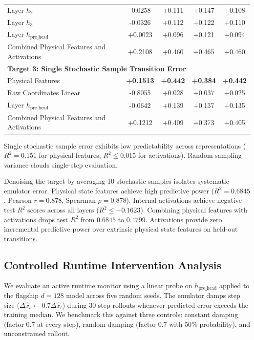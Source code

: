 \documentclass[11pt,a4paper]{article}
\begin{document}
\begin{table}[H]
{\begin{tabular}{lcccc}
Layer $h_2$                                              & -0.0258 & +0.111 & +0.147 & +0.108 \\
Layer $h_3$                                              & -0.0326 & +0.112 & +0.122 & +0.110 \\
Layer $h_{\mathrm{pre\_head}}$                           & +0.0023 & +0.096 & +0.121 & +0.094 \\
Combined Physical Features and Activations                & +0.2108 & +0.460 & +0.465 & +0.460 \\
\midrule
\multicolumn{5}{l}{\textbf{Target 3: Single Stochastic Sample Transition Error}} \\
Physical Features                                         & \textbf{+0.1513} & \textbf{+0.442} & \textbf{+0.384} & \textbf{+0.442} \\
Raw Coordinates Linear                                   & -0.8055 & +0.028 & +0.037 & +0.025 \\
Layer $h_{\mathrm{pre\_head}}$                           & -0.0642 & +0.139 & +0.137 & +0.135 \\
Combined Physical Features and Activations                & +0.1212 & +0.409 & +0.373 & +0.405 \\
\bottomrule
\end{tabular}
}
\end{table}

Single stochastic sample error exhibits low predictability across representations ($R^2 = 0.151$ for physical features, $R^2 \le 0.015$ for activations). Random sampling variance clouds single-step evaluation.

Denoising the target by averaging 10 stochastic samples isolates systematic emulator error. Physical state features achieve high predictive power ($R^2 = 0.6845$, Pearson $r = 0.878$, Spearman $\rho = 0.878$). Internal activations achieve negative test $R^2$ scores across all layers ($R^2 \le -0.1623$). Combining physical features with activations drops test $R^2$ from $0.6845$ to $0.4799$. Activations provide zero incremental predictive power over extrinsic physical state features on held-out transitions.

\subsection{Controlled Runtime Intervention Analysis}
We evaluate an active runtime monitor using a linear probe on $h_{\mathrm{pre\_head}}$ applied to the flagship $d=128$ model across five random seeds. The emulator damps step size ($\Delta \hat{x}_t \leftarrow 0.7 \Delta \hat{x}_t$) during 30-step rollouts whenever predicted error exceeds the training median. We benchmark this against three controls: constant damping (factor $0.7$ at every step), random damping (factor $0.7$ with $50\%$ probability), and unconstrained rollout.
\end{document}
